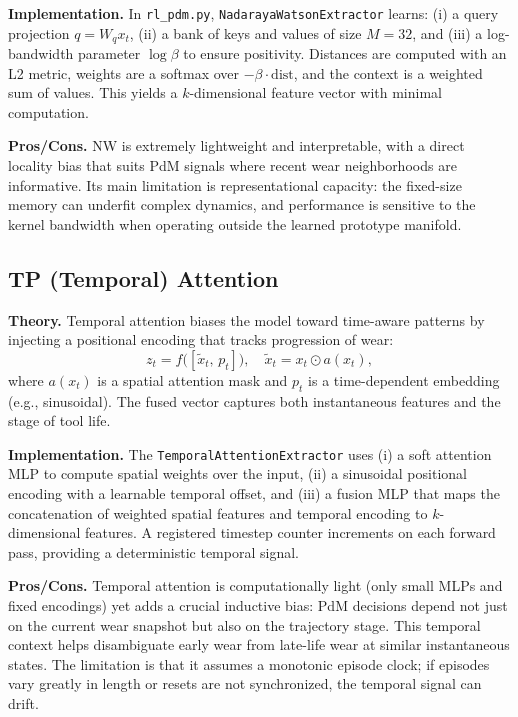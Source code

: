 \documentclass[11pt]{article}
\begin{document}
\textbf{Implementation.} In \texttt{rl\_pdm.py}, \texttt{NadarayaWatsonExtractor} learns: (i) a query projection $q=W_q x_t$, (ii) a bank of keys and values of size $M=32$, and (iii) a log-bandwidth parameter $\log \beta$ to ensure positivity. Distances are computed with an L2 metric, weights are a softmax over $-\beta \cdot \text{dist}$, and the context is a weighted sum of values. This yields a $k$-dimensional feature vector with minimal computation.

\textbf{Pros/Cons.} NW is extremely lightweight and interpretable, with a direct locality bias that suits PdM signals where recent wear neighborhoods are informative. Its main limitation is representational capacity: the fixed-size memory can underfit complex dynamics, and performance is sensitive to the kernel bandwidth when operating outside the learned prototype manifold.

\subsection{TP (Temporal) Attention}
\textbf{Theory.} Temporal attention biases the model toward time-aware patterns by injecting a positional encoding that tracks progression of wear:
\begin{equation}
z_t = f\big([\tilde{x}_t,\, p_t]\big), \quad \tilde{x}_t = x_t \odot a(x_t),
\end{equation}
where $a(x_t)$ is a spatial attention mask and $p_t$ is a time-dependent embedding (e.g., sinusoidal). The fused vector captures both instantaneous features and the stage of tool life.

\textbf{Implementation.} The \texttt{TemporalAttentionExtractor} uses (i) a soft attention MLP to compute spatial weights over the input, (ii) a sinusoidal positional encoding with a learnable temporal offset, and (iii) a fusion MLP that maps the concatenation of weighted spatial features and temporal encoding to $k$-dimensional features. A registered timestep counter increments on each forward pass, providing a deterministic temporal signal.

\textbf{Pros/Cons.} Temporal attention is computationally light (only small MLPs and fixed encodings) yet adds a crucial inductive bias: PdM decisions depend not just on the current wear snapshot but also on the trajectory stage. This temporal context helps disambiguate early wear from late-life wear at similar instantaneous states. The limitation is that it assumes a monotonic episode clock; if episodes vary greatly in length or resets are not synchronized, the temporal signal can drift.
\end{document}
